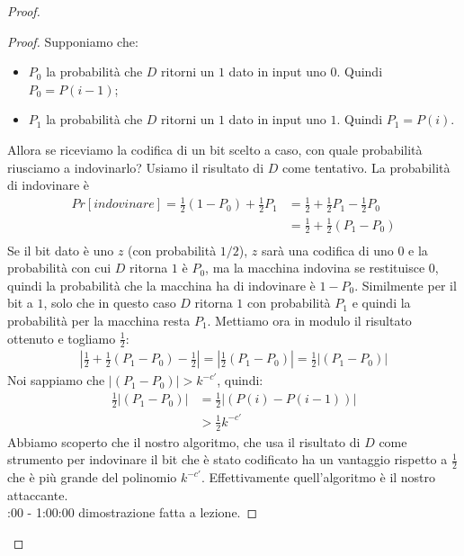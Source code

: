 \begin{proof}
\begin{proof}
Supponiamo che:
\begin{itemize}
    \item $P_0$ la probabilità che $D$ ritorni un $1$ dato in input uno $0$. Quindi $P_0 = P(i-1)$;
    \item $P_1$ la probabilità che $D$ ritorni un $1$ dato in input uno $1$. Quindi $P_1 = P(i)$.
\end{itemize}
\noindent Allora se riceviamo la codifica di un bit scelto a caso, con quale probabilità riusciamo a indovinarlo? Usiamo il risultato di $D$ come tentativo. La probabilità di indovinare è
\begin{align*}
    Pr[indovinare] = \frac{1}{2}\left(1-P_0 \right) + \frac{1}{2} P_1 &= \frac{1}{2} + \frac{1}{2}P_1 - \frac{1}{2}P_0\\
    &= \frac{1}{2} + \frac{1}{2}\left( P_1 - P_0\right)\\
\end{align*}
\noindent Se il bit dato è uno $z$ (con probabilità $1/2$), $z$ sarà una codifica di uno $0$ e la probabilità con cui $D$ ritorna $1$ è $P_0$, ma la macchina indovina se restituisce $0$, quindi la probabilità che la macchina ha di indovinare è $1-P_0$. Similmente per il bit a $1$, solo che in questo caso $D$ ritorna $1$ con probabilità $P_1$ e quindi la probabilità per la macchina resta $P_1$. 
Mettiamo ora in modulo il risultato ottenuto e togliamo $\frac{1}{2}$:
\begin{align*}
    \left| \frac{1}{2} + \frac{1}{2}\left( P_1 - P_0\right) - \frac{1}{2} \right| = \left| \frac{1}{2}\left( P_1 - P_0\right)\right| = \frac{1}{2}\left| \left( P_1 - P_0\right)\right|
\end{align*}
\noindent Noi sappiamo che $\left| \left( P_1 - P_0\right)\right| > k^{-c'}$, quindi:
\begin{align*}
    \frac{1}{2}\bigg| \left( P_1 - P_0\right)\bigg| &= \frac{1}{2}\bigg| \left( P(i) - P(i-1)\right)\bigg|\\
    &> \frac{1}{2}k^{-c'}
\end{align*}
\noindent Abbiamo scoperto che il nostro algoritmo, che usa il risultato di $D$ come strumento per indovinare il bit che è stato codificato ha un vantaggio rispetto a $\frac{1}{2}$ che è più grande del polinomio $k^{-c'}$. Effettivamente quell'algoritmo è il nostro attaccante.\\

:00 - 1:00:00 dimostrazione fatta a lezione.

\end{proof}

\end{proof}

